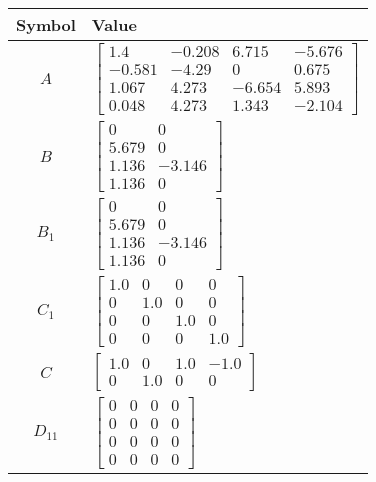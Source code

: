 \begin{tabular}{cl}
\hline
  Symbol  & Value                                                                                                                                                              \\
\hline
   $A$    & $\left[\begin{matrix}1.4 & -0.208 & 6.715 & -5.676\\-0.581 & -4.29 & 0 & 0.675\\1.067 & 4.273 & -6.654 & 5.893\\0.048 & 4.273 & 1.343 & -2.104\end{matrix}\right]$ \\
   $B$    & $\left[\begin{matrix}0 & 0\\5.679 & 0\\1.136 & -3.146\\1.136 & 0\end{matrix}\right]$                                                                               \\
 $B_{1}$  & $\left[\begin{matrix}0 & 0\\5.679 & 0\\1.136 & -3.146\\1.136 & 0\end{matrix}\right]$                                                                               \\
 $C_{1}$  & $\left[\begin{matrix}1.0 & 0 & 0 & 0\\0 & 1.0 & 0 & 0\\0 & 0 & 1.0 & 0\\0 & 0 & 0 & 1.0\end{matrix}\right]$                                                        \\
   $C$    & $\left[\begin{matrix}1.0 & 0 & 1.0 & -1.0\\0 & 1.0 & 0 & 0\end{matrix}\right]$                                                                                     \\
 $D_{11}$ & $\left[\begin{matrix}0 & 0 & 0 & 0\\0 & 0 & 0 & 0\\0 & 0 & 0 & 0\\0 & 0 & 0 & 0\end{matrix}\right]$                                                                \\

\end{tabular}
